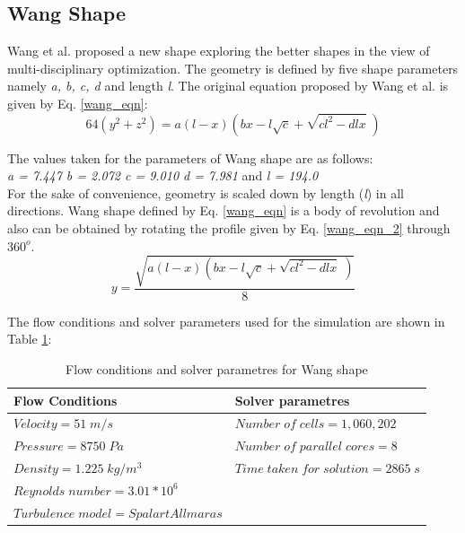 \subsection{Wang Shape \cite{Wangshape}}
Wang et al. \cite{Wangshape} proposed a new shape exploring the better shapes in the view of multi-disciplinary optimization. The geometry is defined by five shape parameters namely \textit{a, b, c, d} and length \textit{l}. The original equation proposed by Wang et al.\cite{Wangshape} is given by Eq. \ref{wang_eqn}:
\begin{equation}
64(y^{2} + z^{2}) = a(l-x)\left( bx - l \sqrt{c} + \sqrt{c l^{2} - dlx} \; \right) 
\label{wang_eqn}
\end{equation}

The values taken for the parameters of Wang shape are as follows: \\
\quad \textit{a = 7.447  \quad b = 2.072  \quad  c = 9.010 \quad d = 7.981} \quad and \quad \textit{l = 194.0} \\

For the sake of convenience, geometry is scaled down by length (\textit{l}) in all directions.
Wang shape defined by Eq. \ref{wang_eqn} is a body of revolution and also can be obtained by rotating the profile given by Eq. \ref{wang_eqn_2} through $ 360^{o} $.
\begin{equation}
y = \dfrac{\sqrt{a(l-x)\left( bx - l \sqrt{c} + \sqrt{c l^{2} - dlx} \; \right)}}{8} 
\label{wang_eqn_2}
\end{equation}

The flow conditions and solver parameters used for the simulation are shown in Table \ref{Flow conditions and solver parametres for Wang shape}:

\begin{table}[H]
	\caption{Flow conditions and solver parametres for Wang shape}
	\label{Flow conditions and solver parametres for Wang shape}
	\centering
	\begin{tabular}{ll}
		\hline \hline
		Flow Conditions & Solver parametres  \\ \hline \hline
		
		$ Velocity = 51 \; m/s$ & $Number \; of \; cells = 1,060,202$    \\  
		$ Pressure = 8750 \; Pa $ & $ Number \; of \; parallel \; cores = 8 $     \\
		$ Density = 1.225 \; kg/m^{3} $ & $ Time \; taken \; for \; solution = 2865 \; s  $    \\
		$ Reynolds \; number = 3.01 * 10^{6} $ &    \\
		$ Turbulence \; model = Spalart Allmaras $ &     \\
		\hline
	\end{tabular}
\end{table}


